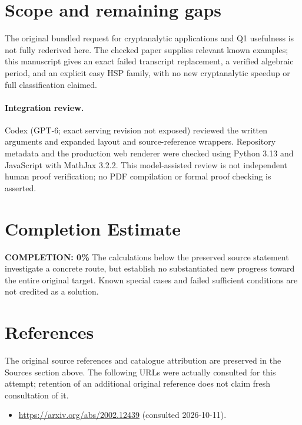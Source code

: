 \documentclass[11pt]{article}
\begin{document}
\section{Scope and remaining gaps}
The original bundled request for cryptanalytic applications and Q1 usefulness is not fully rederived here. The checked paper supplies relevant known examples; this manuscript gives an exact failed transcript replacement, a verified algebraic period, and an explicit easy HSP family, with no new cryptanalytic speedup or full classification claimed.
\paragraph{Integration review.} Codex (GPT-6; exact serving revision not exposed) reviewed the written arguments and expanded layout and source-reference wrappers. Repository metadata and the production web renderer were checked using Python 3.13 and JavaScript with MathJax 3.2.2. This model-assisted review is not independent human proof verification; no PDF compilation or formal proof checking is asserted.

\section{Completion Estimate}
\noindent\textbf{COMPLETION: 0\%}
The calculations below the preserved source statement investigate a concrete route,
but establish no substantiated new progress toward the entire original target.
Known special cases and failed sufficient conditions are not credited as a solution.
\section{References}
The original source references and catalogue attribution are preserved in the
Sources section above. The following URLs were actually consulted for this attempt;
retention of an additional original reference does not claim fresh consultation of it.
\begin{itemize}
\item \url{https://arxiv.org/abs/2002.12439} (consulted 2026-10-11). 
\end{itemize}
\end{document}
